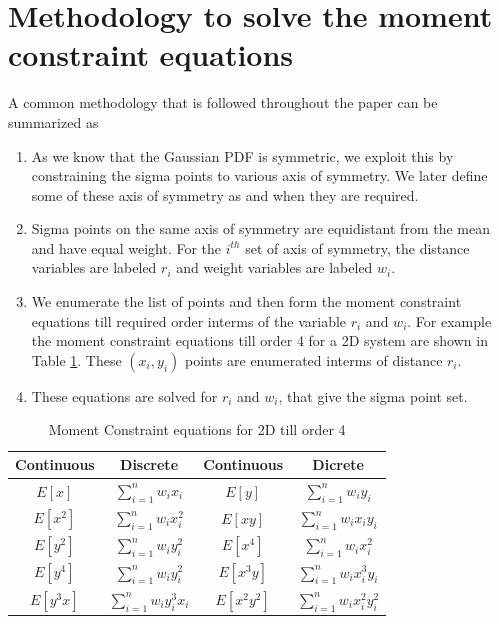 \documentclass[letterpaper, 10 pt, conference]{ieeeconf}  %
\begin{document}
\section{Methodology to solve the moment constraint equations}
A common methodology that is followed throughout the paper can be summarized as
\begin{enumerate}
\item As we know that the Gaussian PDF is symmetric, we exploit this by constraining the sigma points to various axis of symmetry. We later define some of these axis of symmetry as and when they are required.
\item Sigma points on the same axis of symmetry are equidistant from the mean and have equal weight. For the $i^{th}$  set of axis of symmetry, the distance variables are labeled $r_i$ and weight variables are labeled $w_i$.
\item We enumerate the list of points and then form the moment constraint equations till required order interms of the variable $r_i$ and $w_i$. For example the moment constraint equations till order 4 for a 2D system are shown in Table \ref{moment_match}. These $(x_i,y_i)$ points are enumerated interms of distance $r_i$. 
\item These equations are solved for $r_i$ and $w_i$, that give the sigma point set.
\end{enumerate}
\begin{table}
\caption{Moment Constraint equations for 2D till order 4}
\label{moment_match}
\begin{center}
\begin{tabular}{|c|c||c|c|}
\hline
Continuous & Discrete & Continuous & Dicrete\\
\hline
$E[x]$ & $\sum_{i=1}^n{w_ix_i}$& $E[y]$ & $\sum_{i=1}^n{w_iy_i}$\\
\hline
$E[x^2]$ & $\sum_{i=1}^n{w_ix_i^2}$& $E[xy]$ & $\sum_{i=1}^n{w_ix_iy_i}$\\
\hline
$E[y^2]$ & $\sum_{i=1}^n{w_iy_i^2}$& $E[x^4]$ & $\sum_{i=1}^n{w_ix_i^2}$ \\
\hline
$E[y^4]$ & $\sum_{i=1}^n{w_iy_i^2}$& $E[x^3y]$ & $\sum_{i=1}^n{w_ix_i^3y_i}$\\
\hline
$E[y^3x]$ & $\sum_{i=1}^n{w_iy_i^3x_i}$ & $E[x^2y^2]$ & $\sum_{i=1}^n{w_ix_i^2y_i^2}$\\
\hline
\end{tabular}
\end{center}
\end{table}
\end{document}
